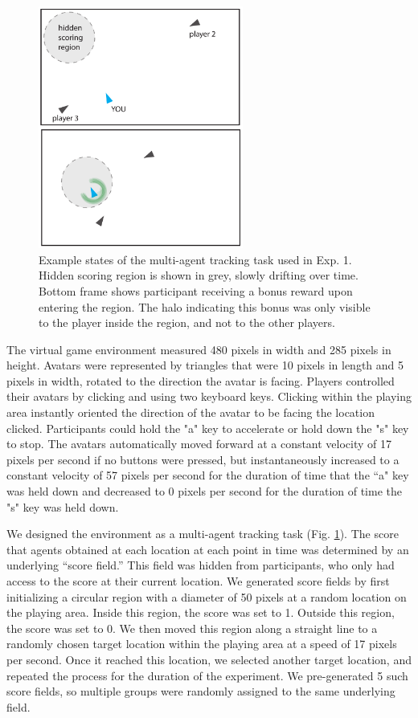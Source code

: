 \documentclass[12pt,letterpaper]{article}
\begin{document}
\begin{figure}[t!]
  \centering
  \includegraphics[width=0.6\textwidth]{./figures/experiment1_design.pdf}
  \hspace{0.1cm}
  \caption{Example states of the multi-agent tracking task used in Exp. 1. Hidden scoring region is shown in grey, slowly drifting over time. Bottom frame shows participant receiving a bonus reward upon entering the region. The halo indicating this bonus was only visible to the player inside the region, and not to the other players.}
  \label{fig:score}
\end{figure}

The virtual game environment measured 480 pixels in width and 285 pixels in height.
Avatars were represented by triangles that were 10 pixels in length and 5 pixels in width, rotated to the direction the avatar is facing. 
Players controlled their avatars by clicking and using two keyboard keys. 
Clicking within the playing area instantly oriented the direction of the avatar to be facing the location clicked. 
Participants could hold the "a" key to accelerate or hold down the "s" key to stop.  
The avatars automatically moved forward at a constant velocity of 17 pixels per second if no buttons were pressed, but instantaneously increased to a constant velocity of 57 pixels per second for the duration of time that the ``a" key was held down and decreased to 0 pixels per second for the duration of time the "s" key was held down. 

We designed the environment as a multi-agent tracking task (Fig. \ref{fig:score}).
The score that agents obtained at each location at each point in time was determined by an underlying ``score field.'' 
This field was hidden from participants, who only had access to the score at their current location. 
We generated score fields by first initializing a circular region with a diameter of 50 pixels at a random location on the playing area. 
Inside this region, the score was set to 1.
Outside this region, the score was set to 0.
We then moved this region along a straight line to a randomly chosen target location within the playing area at a speed of 17 pixels per second.
Once it reached this location, we selected another target location, and repeated the process for the duration of the experiment.
We pre-generated 5 such score fields, so multiple groups were randomly assigned to the same underlying field.  
\end{document}
